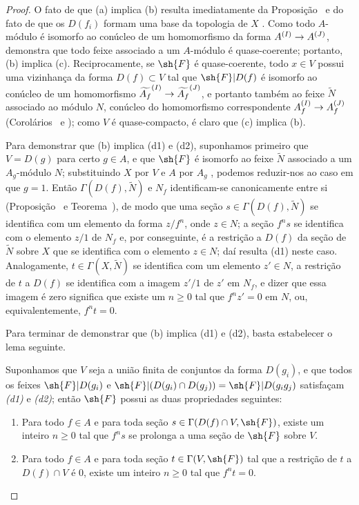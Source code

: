 \documentclass[oneside]{amsart}
\makeatletter
\renewcommand{\geq}{\geqslant}
\newcommand{\ega@arrow}[2]{\mathchoice{#1}{#2}{#2}{#2}}
\renewcommand{\to}{\ega@arrow{\longrightarrow}{\rightarrow}}
\newcommand{\oldpage}[2][]{{\marginnote{\normalfont\textbf{#1}~|~#2}}\ignorespaces}
\let\EGAOriginalLabel\label
\renewcommand{\label}[1]{\phantomsection\EGAOriginalLabel{#1}}
\makeatother
\begin{document}
\begin{proof}
O fato de que (a) implica (b) resulta imediatamente da Proposição~ e do fato de que os $D(f_i)$ formam uma base da topologia de $X$ .
Como todo $A$-módulo é isomorfo ao conúcleo de um homomorfismo da forma $A^{(I)}\to A^{(J)}$,  demonstra que todo feixe associado a um $A$-módulo é quase-coerente;
portanto, (b) implica (c).
Reciprocamente, se $\sh{F}$ é quase-coerente, todo $x\in V$ possui uma vizinhança da forma $D(f)\subset V$ tal que $\sh{F}|D(f)$ é isomorfo ao conúcleo de um homomorfismo $\widetilde{A_f}^{(I)}\to\widetilde{A_f}^{(J)}$, e portanto também ao feixe $\widetilde{N}$ associado ao módulo $N$, conúcleo do homomorfismo correspondente
$A_f^{(I)}\to A_f^{(J)}$ (Corolários~ e );
como $V$ é quase-compacto, é claro que (c) implica (b).

\oldpage[I]{91}
Para demonstrar que (b) implica (d1) e (d2), suponhamos primeiro que $V=D(g)$ para certo $g\in A$, e que $\sh{F}$ é isomorfo ao feixe $\widetilde{N}$ associado a um $A_g$-módulo $N$;
substituindo $X$ por $V$ e $A$ por $A_g$ , podemos reduzir-nos ao caso em que $g=1$.
Então $\Gamma(D(f),\widetilde{N})$ e $N_f$ identificam-se canonicamente entre si (Proposição~ e Teorema~), de modo que uma seção $s\in\Gamma(D(f),\widetilde{N})$ se identifica com um elemento da forma $z/f^n$, onde $z\in N$;
a seção $f^n s$ se identifica com o elemento $z/1$ de $N_f$ e, por conseguinte, é a restrição a $D(f)$ da seção de $\widetilde{N}$ sobre $X$ que se identifica com o elemento $z\in N$;
daí resulta (d1) neste caso.
Analogamente, $t\in\Gamma(X,\widetilde{N})$ se identifica com um elemento $z'\in N$, a restrição de $t$ a $D(f)$ se identifica com a imagem $z'/1$ de $z'$ em $N_f$, e dizer que essa imagem é zero significa que existe um $n\geq 0$ tal que $f^n z'=0$ em $N$, ou, equivalentemente, $f^n t=0$.

Para terminar de demonstrar que (b) implica (d1) e (d2), basta estabelecer o lema seguinte.
\begin{lemma}[1.4.1.1]
\label{I.1.4.1.1}
Suponhamos que $V$ seja a união finita de conjuntos da forma $D(g_i)$, e que todos os feixes $\sh{F}|D(g_i)$ e $\sh{F}|(D(g_i)\cap D(g_j))=\sh{F}|D(g_i g_j)$ satisfaçam \emph{(d1)} e \emph{(d2)};
então $\sh{F}$ possui as duas propriedades seguintes:
\begin{enumerate}
  \item[{\rm(d'1)}] Para todo $f\in A$ e para toda seção $s\in\Gamma(D(f)\cap V,\sh{F})$, existe um inteiro $n\geq 0$ tal que $f^n s$ se prolonga a uma seção de $\sh{F}$ sobre $V$.
  \item[{\rm(d'2)}] Para todo $f\in A$ e para toda seção $t\in\Gamma(V,\sh{F})$ tal que a restrição de $t$ a $D(f)\cap V$ é $0$, existe um inteiro $n\geq 0$ tal que $f^n t=0$.
\end{enumerate}
\end{lemma}


\end{proof}
\end{document}
